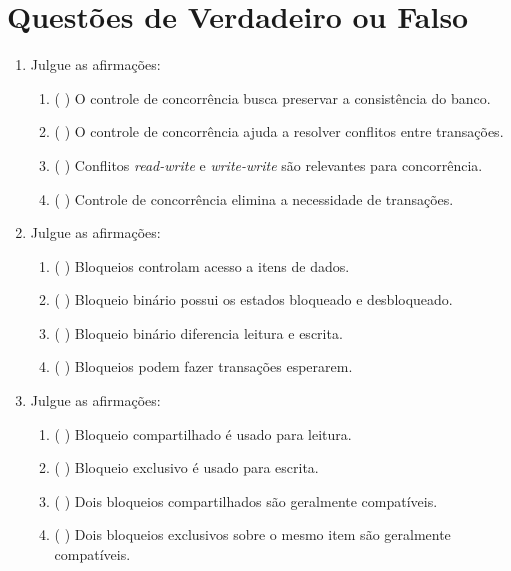 \documentclass[12pt,a4paper]{article}
\begin{document}
\section{Questões de Verdadeiro ou Falso}

\begin{enumerate}[resume,label=\textbf{Q\arabic*.}]

\item Julgue as afirmações:

\begin{enumerate}[label=\alph*)]
    \item ( \quad ) O controle de concorrência busca preservar a consistência do banco.
    \item ( \quad ) O controle de concorrência ajuda a resolver conflitos entre transações.
    \item ( \quad ) Conflitos \textit{read-write} e \textit{write-write} são relevantes para concorrência.
    \item ( \quad ) Controle de concorrência elimina a necessidade de transações.
\end{enumerate}

\item Julgue as afirmações:

\begin{enumerate}[label=\alph*)]
    \item ( \quad ) Bloqueios controlam acesso a itens de dados.
    \item ( \quad ) Bloqueio binário possui os estados bloqueado e desbloqueado.
    \item ( \quad ) Bloqueio binário diferencia leitura e escrita.
    \item ( \quad ) Bloqueios podem fazer transações esperarem.
\end{enumerate}

\item Julgue as afirmações:

\begin{enumerate}[label=\alph*)]
    \item ( \quad ) Bloqueio compartilhado é usado para leitura.
    \item ( \quad ) Bloqueio exclusivo é usado para escrita.
    \item ( \quad ) Dois bloqueios compartilhados são geralmente compatíveis.
    \item ( \quad ) Dois bloqueios exclusivos sobre o mesmo item são geralmente compatíveis.
\end{enumerate}


\end{enumerate}
\end{document}
